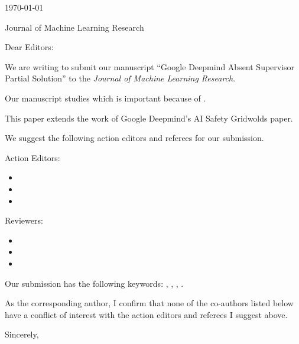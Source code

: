 


\hfill{\today}

Journal of Machine Learning Research

\bigskip

Dear Editors:

We are writing to submit our manuscript ``Google Deepmind Absent Supervisor Partial Solution'' to the \emph{Journal of Machine Learning Research}.

Our manuscript studies  which is important because of .

This paper extends the work of Google Deepmind's AI Safety Gridwolds paper.

We suggest the following action editors and referees for our submission.

Action Editors:
\begin{itemize}
    \item {}
    \item {}
    \item {}
\end{itemize}

Reviewers:
\begin{itemize}
    \item {}
    \item {}
    \item {}

\end{itemize}

Our submission has the following keywords: , , , .

As the corresponding author, I confirm that none of the co-authors listed below have a conflict of interest with the action editors and referees I suggest above. 
\bigskip

Sincerely, 
\medskip
{}








































